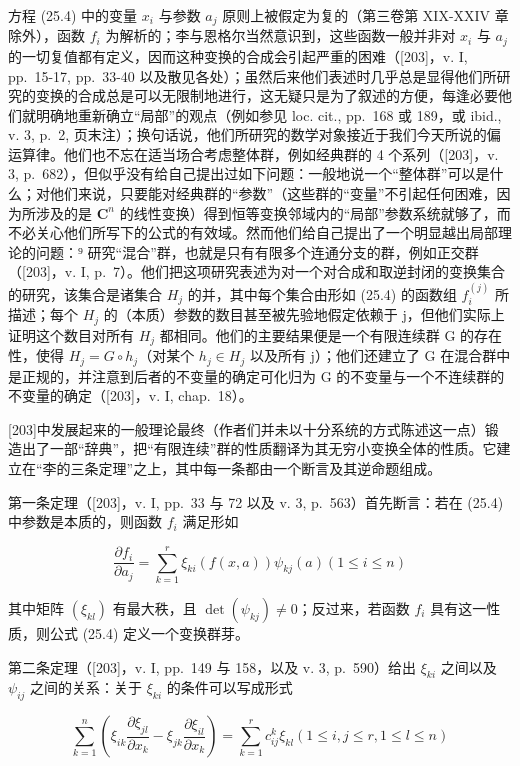 方程 (25.4) 中的变量 \(x_{i}\) 与参数 \(a_{j}\) 原则上被假定为复的（第三卷第 XIX-XXIV 章除外），函数 \(f_{i}\) 为解析的；李与恩格尔当然意识到，这些函数一般并非对 \(x_{i}\) 与 \(a_{j}\) 的一切复值都有定义，因而这种变换的合成会引起严重的困难（{[}203{]}，v. I, pp.~15-17, pp.~33-40 以及散见各处）；虽然后来他们表述时几乎总是显得他们所研究的变换的合成总是可以无限制地进行，这无疑只是为了叙述的方便，每逢必要他们就明确地重新确立“局部”的观点（例如参见 loc. cit., pp.~168 或 189，或 ibid., v. 3, p.~2, 页末注）；换句话说，他们所研究的数学对象接近于我们今天所说的偏运算律。他们也不忘在适当场合考虑整体群，例如经典群的 4 个系列（{[}203{]}，v. 3, p.~682），但似乎没有给自己提出过如下问题：一般地说一个“整体群”可以是什么；对他们来说，只要能对经典群的“参数”（这些群的“变量”不引起任何困难，因为所涉及的是 \(\mathbf{C}^n\) 的线性变换）得到恒等变换邻域内的“局部”参数系统就够了，而不必关心他们所写下的公式的有效域。然而他们给自己提出了一个明显越出局部理论的问题：⁹ 研究“混合”群，也就是只有有限多个连通分支的群，例如正交群（{[}203{]}，v. I, p.~7）。他们把这项研究表述为对一个对合成和取逆封闭的变换集合的研究，该集合是诸集合 \(H_{j}\) 的并，其中每个集合由形如 (25.4) 的函数组 \(f_{i}^{(j)}\) 所描述；每个 \(H_{j}\) 的（本质）参数的数目甚至被先验地假定依赖于 j，但他们实际上证明这个数目对所有 \(H_{j}\) 都相同。他们的主要结果便是一个有限连续群 G 的存在性，使得 \(H_{j} = G \circ h_{j}\)（对某个 \(h_{j} \in H_{j}\) 以及所有 j）；他们还建立了 G 在混合群中是正规的，并注意到后者的不变量的确定可化归为 G 的不变量与一个不连续群的不变量的确定（{[}203{]}，v. I, chap.~18）。

{[}203{]}中发展起来的一般理论最终（作者们并未以十分系统的方式陈述这一点）锻造出了一部“辞典”，把“有限连续”群的性质翻译为其无穷小变换全体的性质。它建立在“李的三条定理”之上，其中每一条都由一个断言及其逆命题组成。

第一条定理（{[}203{]}，v. I, pp.~33 与 72 以及 v. 3, p.~563）首先断言：若在 (25.4) 中参数是本质的，则函数 \(f_{i}\) 满足形如

\[
\frac {\partial f _ {i}}{\partial a _ {j}} = \sum_ {k = 1} ^ {r} \xi_ {k i} (f (x, a)) \psi_ {k j} (a) (1 \leq i \leq n)\tag{25.15}
\]

其中矩阵 \((\xi_{kl})\) 有最大秩，且 \(\det(\psi_{kj}) \neq 0\)；反过来，若函数 \(f_{i}\) 具有这一性质，则公式 (25.4) 定义一个变换群芽。

第二条定理（{[}203{]}，v. I, pp.~149 与 158，以及 v. 3, p.~590）给出 \(\xi_{ki}\) 之间以及 \(\psi_{ij}\) 之间的关系：关于 \(\xi_{ki}\) 的条件可以写成形式

\[
\sum_ {k = 1} ^ {n} \left(\xi_ {i k} \frac {\partial \xi_ {j l}}{\partial x _ {k}} - \xi_ {j k} \frac {\partial \xi_ {i l}}{\partial x _ {k}}\right) = \sum_ {k = 1} ^ {r} c _ {i j} ^ {k} \xi_ {k l} (1 \leq i, j \leq r, 1 \leq l \leq n)\tag{25.16}
\]

